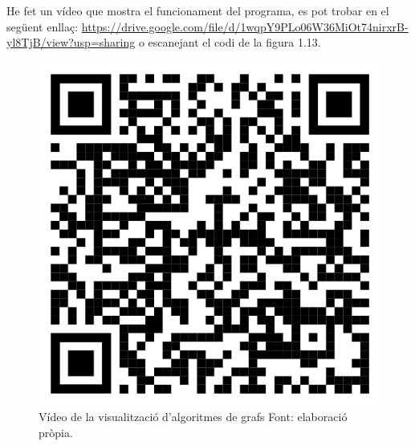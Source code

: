 He fet un vídeo que mostra el funcionament del programa, es pot trobar en el següent enllaç: \url{https://drive.google.com/file/d/1wqpY9PLo06W36MiOt74nirxrB-yl8TjB/view?usp=sharing} o escanejant el codi de la figura 1.13.
\begin{figure}[H]
    \centering
    \includegraphics[width=.15\textwidth]{capitols/figures/16.png}
    \caption[Vídeo de la visualització d'algoritmes de grafs.]{Vídeo de la visualització d'algoritmes de grafs Font: elaboració pròpia.}
    \label{fig:my_label}
\end{figure}
